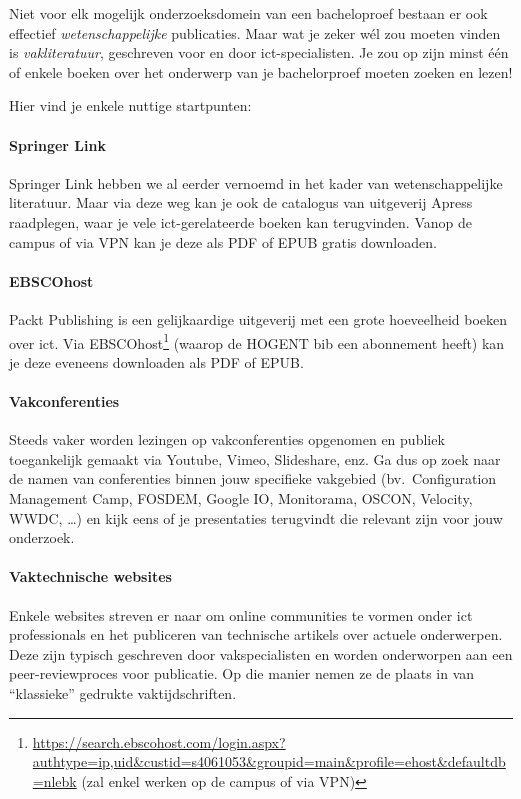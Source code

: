 Niet voor elk mogelijk onderzoeksdomein van een bacheloproef bestaan er ook effectief \textit{wetenschappelijke} publicaties. Maar wat je zeker wél zou moeten vinden is \textit{vakliteratuur}, geschreven voor en door ict-specialisten. Je zou op zijn minst één of enkele boeken over het onderwerp van je bachelorproef moeten zoeken en lezen!

Hier vind je enkele nuttige startpunten:

\paragraph{Springer Link}

Springer Link hebben we al eerder vernoemd in het kader van wetenschappelijke literatuur. Maar via deze weg kan je ook de catalogus van uitgeverij Apress raadplegen, waar je vele ict-gerelateerde boeken kan terugvinden. Vanop de campus of via VPN kan je deze als PDF of EPUB gratis downloaden.

\paragraph{EBSCOhost}

Packt Publishing is een gelijkaardige uitgeverij met een grote hoeveelheid boeken over ict. Via EBSCOhost\footnote{\url{https://search.ebscohost.com/login.aspx?authtype=ip,uid&custid=s4061053&groupid=main&profile=ehost&defaultdb=nlebk} (zal enkel werken op de campus of via VPN)} (waarop de HOGENT bib een abonnement heeft) kan je deze eveneens downloaden als PDF of EPUB.

\paragraph{Vakconferenties}

Steeds vaker worden lezingen op vakconferenties opgenomen en publiek toegankelijk gemaakt via Youtube, Vimeo, Slideshare, enz. Ga dus op zoek naar de namen van conferenties binnen jouw specifieke vakgebied (bv.\ Configuration Management Camp, FOSDEM, Google IO, Monitorama, OSCON, Velocity, WWDC, \ldots) en kijk eens of je presentaties terugvindt die relevant zijn voor jouw onderzoek.

\paragraph{Vaktechnische websites}

Enkele websites streven er naar om online communities te vormen onder ict professionals en het publiceren van technische artikels over actuele onderwerpen. Deze zijn typisch geschreven door vakspecialisten en worden onderworpen aan een peer-re\-view\-pro\-ces voor publicatie. Op die manier nemen ze de plaats in van ``klassieke'' gedrukte vaktijdschriften.


